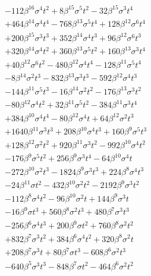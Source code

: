 {\begin{align*}
&-112\beta^{16} \sigma^{4} t^{2}+8\beta^{15} \sigma^{5} t^{2}-32\beta^{15} \sigma^{3} t^{4}\\
&+464\beta^{14} \sigma^{4} t^{4}-768\beta^{13} \sigma^{5} t^{4}+128\beta^{12} \sigma^{6} t^{4}\\
&+200\beta^{15} \sigma^{3} t^{3}+352\beta^{14} \sigma^{4} t^{3}+96\beta^{12} \sigma^{6} t^{3}\\
&+320\beta^{14} \sigma^{4} t^{2}+360\beta^{13} \sigma^{5} t^{2}+160\beta^{13} \sigma^{3} t^{4}\\
&+40\beta^{12} \sigma^{6} t^{2}-480\beta^{12} \sigma^{4} t^{4}-128\beta^{11} \sigma^{5} t^{4}\\
&-8\beta^{14} \sigma^{2} t^{3}-832\beta^{13} \sigma^{3} t^{3}-592\beta^{12} \sigma^{4} t^{3}\\
&-144\beta^{11} \sigma^{5} t^{3}-16\beta^{14} \sigma^{2} t^{2}-176\beta^{13} \sigma^{3} t^{2}\\
&-80\beta^{12} \sigma^{4} t^{2}+32\beta^{11} \sigma^{5} t^{2}-384\beta^{11} \sigma^{3} t^{4}\\
&+384\beta^{10} \sigma^{4} t^{4}-80\beta^{12} \sigma^{4} t+64\beta^{12} \sigma^{2} t^{3}\\
&+1640\beta^{11} \sigma^{3} t^{3}+208\beta^{10} \sigma^{4} t^{3}+160\beta^{9} \sigma^{5} t^{3}\\
&+128\beta^{12} \sigma^{2} t^{2}+920\beta^{11} \sigma^{3} t^{2}-992\beta^{10} \sigma^{4} t^{2}\\
&-176\beta^{9} \sigma^{5} t^{2}+256\beta^{9} \sigma^{3} t^{4}-64\beta^{10} \sigma^{4} t\\
&-272\beta^{10} \sigma^{2} t^{3}-1824\beta^{9} \sigma^{3} t^{3}+224\beta^{8} \sigma^{4} t^{3}\\
&-24\beta^{11} \sigma t^{2}-432\beta^{10} \sigma^{2} t^{2}-2192\beta^{9} \sigma^{3} t^{2}\\
&-112\beta^{8} \sigma^{4} t^{2}-96\beta^{10} \sigma^{2} t+144\beta^{9} \sigma^{3} t\\
&-16\beta^{9} \sigma t^{3}+560\beta^{8} \sigma^{2} t^{3}+480\beta^{7} \sigma^{3} t^{3}\\
&-256\beta^{6} \sigma^{4} t^{3}+200\beta^{9} \sigma t^{2}+760\beta^{8} \sigma^{2} t^{2}\\
&+832\beta^{7} \sigma^{3} t^{2}+384\beta^{6} \sigma^{4} t^{2}+320\beta^{8} \sigma^{2} t\\
&+208\beta^{7} \sigma^{3} t+80\beta^{7} \sigma t^{3}-608\beta^{6} \sigma^{2} t^{3}\\
&-640\beta^{5} \sigma^{3} t^{3}-848\beta^{7} \sigma t^{2}-464\beta^{6} \sigma^{2} t^{2}\\

\end{align*}}

